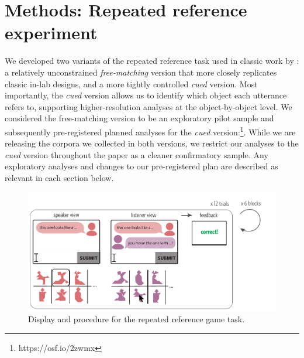 \documentclass[alpha-refs]{wiley-article}
\begin{document}




\section{Methods: Repeated reference experiment}

We developed two variants of the repeated reference task used in classic work by \cite{ClarkWilkesGibbs86_ReferringCollaborative}: a relatively unconstrained \emph{free-matching} version that more closely replicates classic in-lab designs, and a more tightly controlled \emph{cued} version.
Most importantly, the \emph{cued} version allows us to identify which object each utterance refers to, supporting higher-resolution analyses at the object-by-object level.
We considered the free-matching version to be an exploratory pilot sample and subsequently pre-registered planned analyses for the \emph{cued} version:\footnote{https://osf.io/2zwmx}.
While we are releasing the corpora we collected in both versions, we restrict our analyses to the \emph{cued} version throughout the paper as a cleaner confirmatory sample.
Any exploratory analyses and changes to our pre-registered plan are described as relevant in each section below.

\begin{figure}
\centering
\vspace{-1em}
\includegraphics[scale=.87]{designAndExample.pdf}
\caption{Display and procedure for the repeated reference game task.}
\label{fig:design}
\end{figure}
\end{document}
